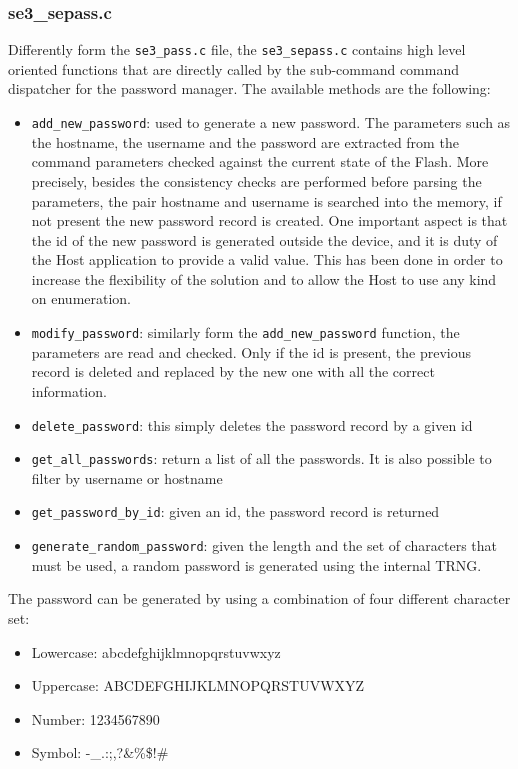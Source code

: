 \subsubsection{se3\_sepass.c}
\label{sec:se3_sepass.c}
Differently form the \texttt{se3\_pass.c} file, the \texttt{se3\_sepass.c} contains high level oriented functions that are directly called by the sub-command command dispatcher for the password manager.\newline\newline
The available methods are the following:
\begin{itemize}
	\item \texttt{add\_new\_password}: used to generate a new password. The parameters such as the hostname, the username and the password are extracted from the command parameters checked against the current state of the Flash. More precisely, besides the consistency checks are performed before parsing the parameters, the pair hostname and username is searched into the memory, if not present the new password record is created. One important aspect is that the id of the new password is generated outside the device, and it is duty of the Host application to provide a valid value. This has been done in order to increase the flexibility of the solution and to allow the Host to use any kind on enumeration.
	\item \texttt{modify\_password}: similarly form the \texttt{add\_new\_password} function, the parameters are read and checked. Only if the id is present, the previous record is deleted and replaced by the new one with all the correct information.
	\item \texttt{delete\_password}: this simply deletes the password record by a given id
	\item \texttt{get\_all\_passwords}: return a list of all the passwords. It is also possible to filter by username or hostname
	\item \texttt{get\_password\_by\_id}: given an id, the password record is returned
	\item \texttt{generate\_random\_password}: given the length and the set of characters that must be used, a random password is generated using the internal TRNG.
\end{itemize}

The password can be generated by using a combination of four different character set:
\begin{itemize}
	\item Lowercase: abcdefghijklmnopqrstuvwxyz
	\item Uppercase: ABCDEFGHIJKLMNOPQRSTUVWXYZ
	\item Number: 1234567890
	\item Symbol: -\_.:;,?\&\%\$!\@\#
\end{itemize}

